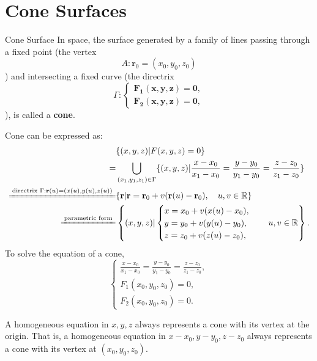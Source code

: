 \documentclass[11pt]{../../TexTemplate/elegantbook} %
\begin{document}
\section{Cone Surfaces}
\begin{definition}{Cone Surface}
    In space, the surface generated by a family of lines passing through a fixed point 
    (the vertex \[A:\mathbf{r}_{0}=(x_{0},y_{0},z_{0})\]) 
    and intersecting a fixed curve 
    (the directrix \[\Gamma : \mathbf{\begin{cases} F_{1}(x,y,z) = 0,\\ F_{2}(x,y,z) = 0,\end{cases}}\]), 
    is called a \textbf{cone}.
\end{definition}
Cone can be expressed as:
\begin{align*}
    &\{ (x,y,z) | F(x,y,z) = 0 \} \\
    =&\bigcup_{(x_{1},y_{1},z_{1}) \in \Gamma} \{ (x,y,z) | \frac{x - x_{0}}{x_{1} - x_{0}} = \frac{y - y_{0}}{y_{1} - y_{0}} = \frac{z - z_{0}}{z_{1} - z_{0}} \}\\
    \xlongequal{\text{directrix } \Gamma:\mathbf{r}(u)=(x(u),y(u),z(u))}
    &\{ \mathbf{r} | \mathbf{r} = \mathbf{r}_{0}+v (\mathbf{r}(u)-\mathbf{r}_{0}),\quad u,v \in \mathbb{R} \} \\
    \xlongequal{\text{parametric form}}
    &  \left\{ (x,y,z) | \begin{cases} x = x_{0} + v(x(u) - x_{0}), \\ y = y_{0} + v(y(u) - y_{0}), \\ z = z_{0} + v(z(u) - z_{0}), \end{cases}\quad u,v \in \mathbb{R} \right\}.
\end{align*}
To solve the equation of a cone,
\[
\begin{cases}
    \frac{x - x_{0}}{x_{1} - x_{0}} = \frac{y - y_{0}}{y_{1} - y_{0}} = \frac{z - z_{0}}{z_{1} - z_{0}}, \\
    F_{1}(x_{0},y_{0},z_{0}) = 0, \\
    F_{2}(x_{0},y_{0},z_{0}) = 0.
\end{cases}
\]

\vspace{0.7cm}
\begin{theorem}
    A homogeneous equation in \(x, y, z\) always represents a cone with its vertex at the origin.
    That is, a homogeneous equation in \(x-x_{0}, y-y_{0}, z-z_{0}\) always represents a cone 
    with its vertex at \((x_{0}, y_{0}, z_{0})\).
\end{theorem}
\end{document}
